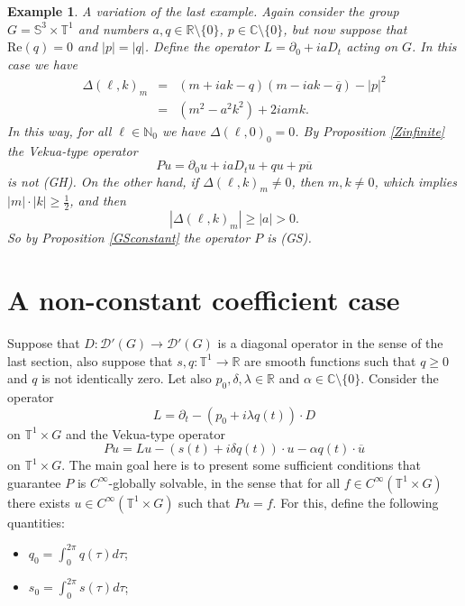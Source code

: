 \documentclass[sn-mathphys-num]{sn-jnl}%
\numberwithin{equation}{section}
\theoremstyle{thmstyleone}
\theoremstyle{thmstyletwo}
\newtheorem{example}{Example}[section]
\theoremstyle{thmstylethree}
\renewcommand{\Re}{\textrm{Re}}
\begin{document}
\begin{example} A variation of the last example. Again consider the group $G=\mathbb{S}^3 \times \mathbb{T}^1$ and numbers $a,q \in \mathbb{R}\setminus\{0\}$, $p \in \mathbb{C}\setminus\{0\}$, but now suppose that $\Re(q)=0$ and $|p|=|q|$. Define the operator $L=\partial_0+iaD_t$ acting on $G$. In this case we have
\begin{eqnarray*}
 \Delta(\ell,k)_m & = & (m+iak-q)(m-iak-\overline{q})-|p|^2 \\
 & = & (m^2-a^2k^2)+2iamk.
\end{eqnarray*} 
In this way, for all $\ell \in \mathbb{N}_0$ we have $\Delta(\ell,0)_0=0$. By Proposition \ref{Zinfinite} the Vekua-type operator
$$Pu=\partial_0u+iaD_tu+qu+p\overline{u}$$
is not (GH). On the other hand, if $\Delta(\ell,k)_m \neq 0$, then $m,k \neq 0$, which implies $|m|\cdot |k|\geq \frac{1}{2}$, and then
$$|\Delta(\ell,k)_m| \geq |a|>0.$$
So by Proposition \ref{GSconstant} the operator $P$ is (GS). 
	
\end{example}


\section{A non-constant coefficient case}\label{nonconstant} 

Suppose that $D:\mathcal{D}'(G) \rightarrow \mathcal{D}'(G)$ is a diagonal operator in the sense of the last section, also suppose that $s,q:\mathbb{T}^1\rightarrow \mathbb{R}$ are smooth functions such that $q\geq 0$ and $q$ is not identically zero. Let also $p_0,\delta,\lambda \in \mathbb{R}$ and $\alpha \in \mathbb{C}\setminus \{0\}$. Consider the operator
\begin{equation}\label{Lnonconstant}
	L=\partial_t -(p_0+i\lambda q(t))\cdot D
\end{equation}
on $\mathbb{T}^1 \times G$ and the Vekua-type operator
\begin{equation}\label{Pnonconstant}
	Pu=Lu-(s(t)+i\delta q(t))\cdot u-\alpha q(t) \cdot \overline{u}
\end{equation}
on $\mathbb{T}^1\times G$. The main goal here is to present some sufficient conditions that guarantee $P$ is $C^\infty$-globally solvable, in the sense that for all $f \in C^\infty(\mathbb{T}^1 \times G)$ there exists $u \in C^\infty(\mathbb{T}^1 \times G)$ such that $Pu=f$. For this, define the following quantities:

\begin{itemize}
	\item $q_0=\int_0^{2\pi} q(\tau)d\tau$;
	\item $s_0=\int_0^{2\pi} s(\tau)d\tau$;
\end{itemize}
\end{document}
